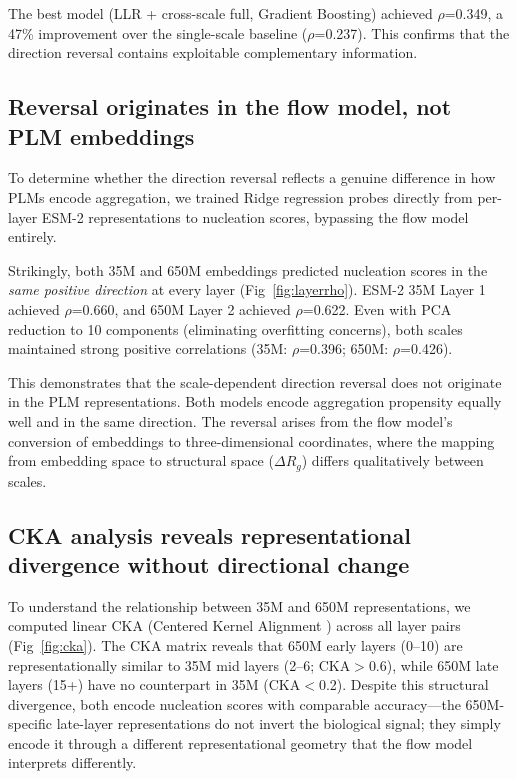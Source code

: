 \documentclass[10pt,letterpaper]{article}
\begin{document}
The best model (LLR + cross-scale full, Gradient Boosting) achieved $\rho$=0.349, a 47\% improvement over the single-scale baseline ($\rho$=0.237). This confirms that the direction reversal contains exploitable complementary information.

\subsection*{Reversal originates in the flow model, not PLM embeddings}

To determine whether the direction reversal reflects a genuine difference in how PLMs encode aggregation, we trained Ridge regression probes directly from per-layer ESM-2 representations to nucleation scores, bypassing the flow model entirely.

Strikingly, both 35M and 650M embeddings predicted nucleation scores in the \textit{same positive direction} at every layer (Fig~\ref{fig:layerrho}). ESM-2 35M Layer 1 achieved $\rho$=0.660, and 650M Layer 2 achieved $\rho$=0.622. Even with PCA reduction to 10 components (eliminating overfitting concerns), both scales maintained strong positive correlations (35M: $\rho$=0.396; 650M: $\rho$=0.426).

This demonstrates that the scale-dependent direction reversal does not originate in the PLM representations. Both models encode aggregation propensity equally well and in the same direction. The reversal arises from the flow model's conversion of embeddings to three-dimensional coordinates, where the mapping from embedding space to structural space ($\Delta R_g$) differs qualitatively between scales.

\subsection*{CKA analysis reveals representational divergence without directional change}

To understand the relationship between 35M and 650M representations, we computed linear CKA (Centered Kernel Alignment \cite{kornblith2019}) across all layer pairs (Fig~\ref{fig:cka}). The CKA matrix reveals that 650M early layers (0--10) are representationally similar to 35M mid layers (2--6; CKA$>$0.6), while 650M late layers (15+) have no counterpart in 35M (CKA$<$0.2). Despite this structural divergence, both encode nucleation scores with comparable accuracy---the 650M-specific late-layer representations do not invert the biological signal; they simply encode it through a different representational geometry that the flow model interprets differently.
\end{document}
